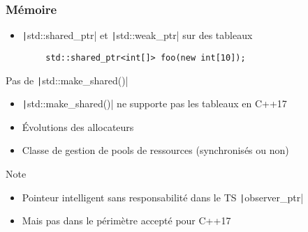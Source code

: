 \documentclass[C++.tex]{subfiles}
\begin{document}
\begin{frame}[fragile]
	\frametitle{Mémoire}
	\begin{itemize}
		\item \texttt|std::shared_ptr| et \texttt|std::weak_ptr| sur des tableaux
	\end{itemize}

	\begin{verbatim}
		std::shared_ptr<int[]> foo(new int[10]);
	\end{verbatim}

	\begin{alertblock}{Pas de \texttt|std::make_shared()|}
		\begin{itemize}
			\item \texttt|std::make_shared()| ne supporte pas les tableaux en C++17
		\end{itemize}
	\end{alertblock}

	\begin{itemize}
		\item Évolutions des allocateurs


		\item Classe de gestion de pools de ressources (synchronisés ou non)
	\end{itemize}

	\begin{block}{Note}
		\begin{itemize}
			\item Pointeur intelligent sans responsabilité dans le TS \texttt|observer_ptr|
			\item Mais pas dans le périmètre accepté pour C++17
		\end{itemize}
	\end{block}

\end{frame}
\end{document}
